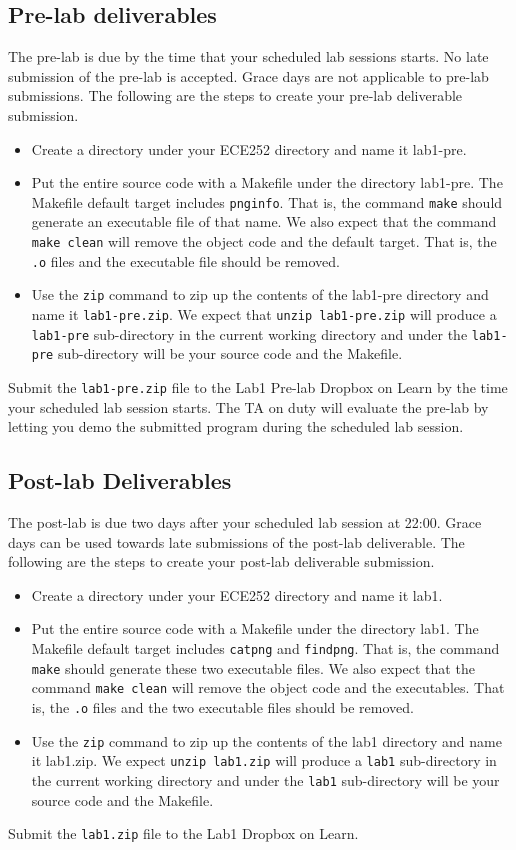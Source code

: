 \subsection{Pre-lab deliverables}
\label{lab1_prelab_deliverable}
The pre-lab is due by the time that your scheduled lab sessions starts. No late submission of the pre-lab is accepted. Grace days are not applicable to pre-lab submissions. The following are the steps to create your pre-lab deliverable submission.
\begin{itemize}
\item Create a directory under your ECE252 directory and name it lab1-pre.
\item Put the entire source code with a Makefile under the directory lab1-pre. The Makefile default target includes \verb+pnginfo+. That is, the command \verb+make+ should generate an executable file of that name. We also expect that the command \verb+make clean+ will remove the object code and the default target. That is, the \verb+.o+ files and the executable file should be removed.
\item Use the \verb+zip+ command to zip up the contents of the lab1-pre directory and name it \verb+lab1-pre.zip+. We expect that \verb+unzip lab1-pre.zip+ will produce a \verb+lab1-pre+ sub-directory in the current working directory and under the \verb+lab1-pre+ sub-directory will be your source code and the Makefile.
\end{itemize}
Submit the \verb+lab1-pre.zip+ file to the Lab1 Pre-lab Dropbox on Learn by the time your scheduled lab session starts. The TA on duty will evaluate the pre-lab by letting you demo the submitted program during the scheduled lab session.

\subsection{Post-lab Deliverables}
The post-lab is due two days after your scheduled lab session at 22:00. Grace days can be used towards late submissions of the post-lab deliverable. The following are the steps to create your post-lab deliverable submission.
\begin{itemize}
\item Create a directory under your ECE252 directory and name it lab1.
\item Put the entire source code with a Makefile under the directory lab1. The Makefile default target includes \verb+catpng+ and \verb+findpng+. That is, the command \verb+make+ should generate these two executable files. We also expect that the command \verb+make clean+ will remove the object code and the executables. That is, the \verb+.o+ files and the two executable files should be removed.
\item Use the \verb+zip+ command to zip up the contents of the lab1 directory and name it lab1.zip. We expect \verb+unzip lab1.zip+ will produce a \verb+lab1+ sub-directory in the current working directory and under the \verb+lab1+ sub-directory will be your source code and the Makefile.
\end{itemize}
Submit the \verb+lab1.zip+ file to the Lab1 Dropbox on Learn.
